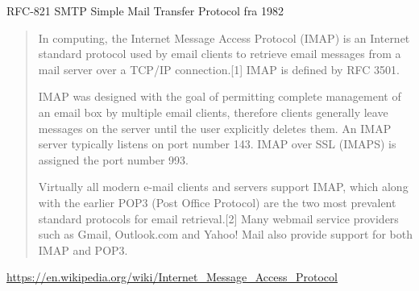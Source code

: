 \documentclass[Screen16to9,17pt]{foils}
\begin{document}
\begin{list2}
\item RFC-821 SMTP Simple Mail Transfer Protocol fra 1982
\item {}
\end{list2}



\begin{quote}
In computing, the Internet Message Access Protocol (IMAP) is an Internet standard protocol used by email clients to retrieve email messages from a mail server over a TCP/IP connection.[1] IMAP is defined by RFC 3501.

IMAP was designed with the goal of permitting complete management of an email box by multiple email clients, therefore clients generally leave messages on the server until the user explicitly deletes them. An IMAP server typically listens on port number 143. IMAP over SSL (IMAPS) is assigned the port number 993.

Virtually all modern e-mail clients and servers support IMAP, which along with the earlier POP3 (Post Office Protocol) are the two most prevalent standard protocols for email retrieval.[2] Many webmail service providers such as Gmail, Outlook.com and Yahoo! Mail also provide support for both IMAP and POP3.
\end{quote}

\url{https://en.wikipedia.org/wiki/Internet_Message_Access_Protocol}




\end{document}
